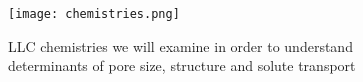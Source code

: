 \begin{figure}
\centering
\texttt{[image: chemistries.png]}  %
	\caption{LLC chemistries we will examine in order to understand determinants of pore size, structure and solute transport}
	\label{fig:chemistries}
\end{figure}

